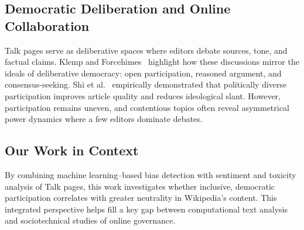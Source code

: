 \subsection{Democratic Deliberation and Online Collaboration}
Talk pages serve as deliberative spaces where editors debate sources, tone, and factual claims. Klemp and Forcehimes~\cite{klemp2010town} highlight how these discussions mirror the ideals of deliberative democracy: open participation, reasoned argument, and consensus-seeking. Shi et al.~\cite{shi2019wisdom} empirically demonstrated that politically diverse participation improves article quality and reduces ideological slant. However, participation remains uneven, and contentious topics often reveal asymmetrical power dynamics where a few editors dominate debates.

\subsection{Our Work in Context}
By combining machine learning–based bias detection with sentiment and toxicity analysis of Talk pages, this work investigates whether inclusive, democratic participation correlates with greater neutrality in Wikipedia’s content. This integrated perspective helps fill a key gap between computational text analysis and sociotechnical studies of online governance.
